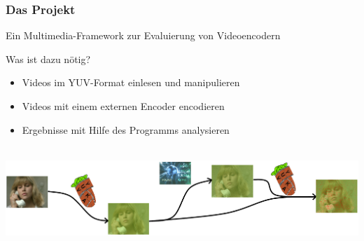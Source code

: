 \documentclass[t]{beamer}
\begin{document}
\begin{frame}
	\frametitle{Das Projekt}
	\begin{center}
		Ein Multimedia-Framework zur Evaluierung von Videoencodern	
	\end{center}
	 Was ist dazu nötig? \newline
	\begin{itemize}
		\item<1-> Videos im YUV-Format einlesen und manipulieren
		\item<2-> Videos mit einem externen Encoder encodieren
		\item<3-> Ergebnisse mit Hilfe des Programms analysieren
	\end{itemize}
	~\\
	\includegraphics[scale=.34]{YuvKA-Workchart.png}
\end{frame}
\end{document}
